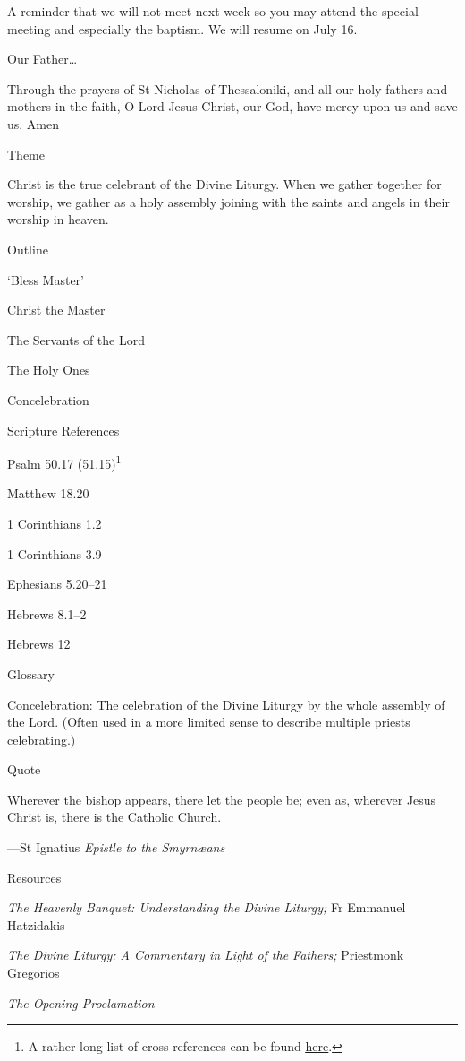\documentclass[
]{article}
\begin{document}
A reminder that we will not meet next week so you may attend the special
meeting and especially the baptism. We will resume on July 16.

Our Father\ldots{}

Through the prayers of St Nicholas of Thessaloniki, and all our holy
fathers and mothers in the faith, O Lord Jesus Christ, our God, have
mercy upon us and save us. Amen

Theme

Christ is the true celebrant of the Divine Liturgy. When we gather
together for worship, we gather as a holy assembly joining with the
saints and angels in their worship in heaven.

Outline

`Bless Master'

Christ the Master

The Servants of the Lord

The Holy Ones

Concelebration

Scripture References

Psalm 50.17 (51.15)\footnote{A rather long list of cross references can
  be found
  \href{http://jimmyakin.com/deuterocanonical-references-in-the-new-testament}{\ul{here}}.}

Matthew 18.20

1 Corinthians 1.2

1 Corinthians 3.9

Ephesians 5.20--21

Hebrews 8.1--2

Hebrews 12

Glossary

Concelebration: The celebration of the Divine Liturgy by the whole
assembly of the Lord. (Often used in a more limited sense to describe
multiple priests celebrating.)

Quote

Wherever the bishop appears, there let the people be; even as, wherever
Jesus Christ is, there is the Catholic Church.

---St Ignatius \emph{Epistle to the Smyrnæans}

Resources

\emph{The Heavenly Banquet: Understanding the Divine Liturgy;} Fr
Emmanuel Hatzidakis

\emph{The Divine Liturgy: A Commentary in Light of the Fathers;}
Priestmonk Gregorios

\emph{The Opening Proclamation}
\end{document}
